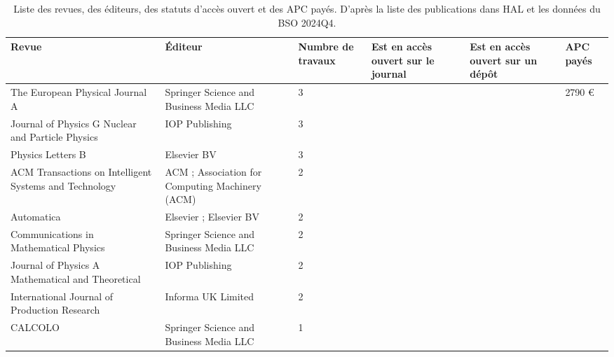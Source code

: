 \begin{longtable}{p{.27\linewidth}P{.18\linewidth}P{.07\linewidth}P{.12\linewidth}P{.12\linewidth}P{.07\linewidth}}
\caption{Liste des revues, des éditeurs, des statuts d'accès ouvert et des APC payés. D'après la liste des publications dans HAL et les données du BSO 2024Q4.}
\label{tab_journals}\\
\toprule
Revue & Éditeur & Numbre de travaux & Est en accès ouvert sur le journal & Est en accès ouvert sur un dépôt & APC payés \\
\midrule
The European Physical Journal A & Springer Science and Business Media LLC & 3 &    &    & 2790 € \\
Journal of Physics G Nuclear and Particle Physics & IOP Publishing & 3 &    &    &  \\
Physics Letters B & Elsevier BV & 3 &    &    &  \\
ACM Transactions on Intelligent Systems and Technology & ACM ; Association for Computing Machinery (ACM) & 2 &   &   &  \\
Automatica & Elsevier ; Elsevier BV & 2 &   &   &  \\
Communications in Mathematical Physics & Springer Science and Business Media LLC & 2 &   &   &  \\
Journal of Physics A Mathematical and Theoretical & IOP Publishing & 2 &   &   &  \\
International Journal of Production Research & Informa UK Limited & 2 &   &   &  \\
CALCOLO & Springer Science and Business Media LLC & 1 &  &  &  \\

\end{longtable}
